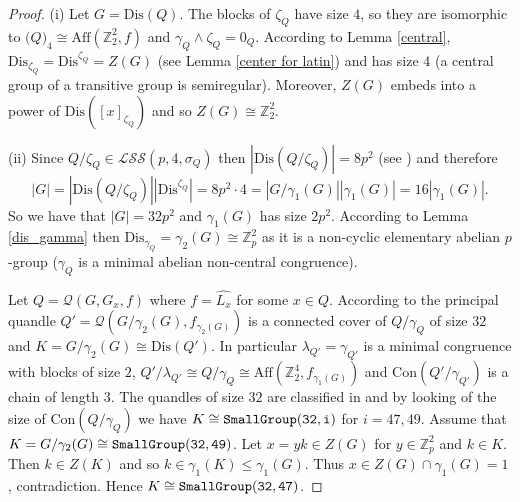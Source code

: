 \documentclass[a4paper, english, 9pt]{amsart}
\theoremstyle{plain}
\theoremstyle{definition}
\def\aff#1{\mathrm{Aff}#1}
\def\dis{\mathrm{Dis}}
\def\con{\mathrm{Con}}
\def\Z{\mathbb Z}
\def\ma{\mathcal Min}
\def\LSS{\mathcal{LSS}}
\begin{document}
\begin{proof}

(i) Let $G=\dis(Q)$. The blocks of $\zeta_Q$ have size $4$, so they are isomorphic to $\mathcal(Q)_4\cong \aff(\Z_2^2,f)$ and $\gamma_Q\wedge\zeta_Q=0_Q$. According to Lemma \ref{central}, $\dis_{\zeta_Q}=\dis^{\zeta_Q}=Z(G)$ (see Lemma \ref{center for latin}) and has size $4$ (a central group of a transitive group is semiregular). Moreover, $Z(G)$ embeds into a power of $\dis([x]_{\zeta_Q})$ and so $Z(G)\cong \Z_2^2$. %

(ii) Since $Q/\zeta_Q\in \LSS(p,4,\sigma_Q)$ then $|\dis(Q/\zeta_Q)|=8p^2$ (see \cite[Proposition 5.4]{LSS}) and therefore $$|G|=|\dis(Q/\zeta_Q)||\dis^{\zeta_Q}|= 8p^2\cdot 4=|G/\gamma_1(G)||\gamma_1(G)|=16|\gamma_1(G)|.$$ So we have that $|G|=32p^2$ and $\gamma_1(G)$ has size $2p^2$. According to Lemma \ref{dis_gamma} then $\dis_{\gamma_Q}=\gamma_2(G)\cong \Z_p^2$ as it is a non-cyclic elementary abelian $p$-group ($\gamma_Q$ is a minimal abelian non-central congruence).

Let $Q=\mathcal{Q}(G,G_x,f)$ where $f=\widehat{L_x}$ for some $x\in Q$. According to \cite[Lemma 1.10]{Involutory} the principal quandle $Q'=\mathcal{Q}(G/\gamma_2(G),f_{\gamma_2(G)})$ is a connected cover of $Q/\gamma_Q$ of size $32$ and $K=G/\gamma_2(G)\cong \dis(Q')$. In particular $\lambda_{Q'}=\gamma_{Q'}$ is a minimal congruence with blocks of size $2$, $Q'/\lambda_{Q'}\cong Q/\gamma_Q\cong \aff(\Z_2^4,f_{\gamma_1(G)})$ and $\con(Q'/\gamma_{Q'})$ is a chain of length $3$. The quandles of size $32$ are classified in \cite{RIG} and by looking of the size of $\con(Q/\gamma_Q)$ we have $K\cong {\tt SmallGroup(32,i)}$ for $i=47,49$. Assume that $K=G/\gamma_2(G)\cong{\tt SmallGroup(32,49)}$. Let $x=yk\in Z(G)$ for $y\in \Z_p^2$ and $k\in K$. Then $k\in Z(K)$ and so $k\in \gamma_1(K)\leq \gamma_1(G)$. Thus $x\in Z(G)\cap \gamma_1(G)=1$, contradiction. Hence $K\cong {\tt SmallGroup(32,47)}$.




\end{proof}
\end{document}
